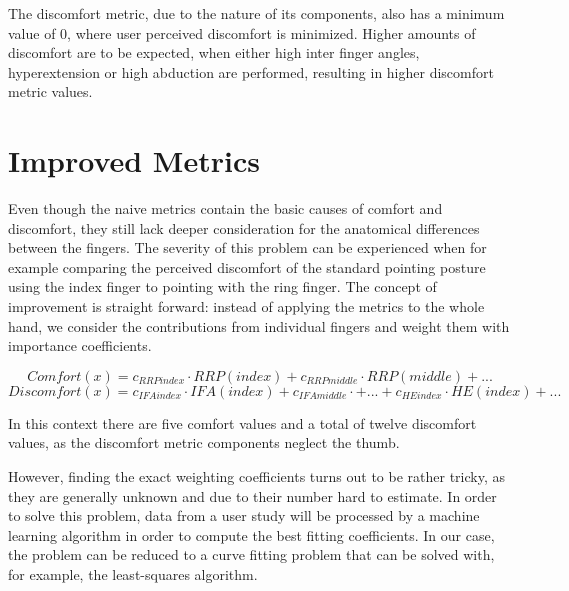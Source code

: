 The discomfort metric, due to the nature of its components, also has a minimum value of 0, where user perceived discomfort is minimized. Higher amounts of discomfort are to be expected, when either high inter finger angles, hyperextension or high abduction are performed, resulting in higher discomfort metric values. 

\section{Improved Metrics}

Even though the naive metrics contain the basic causes of comfort and discomfort, they still lack deeper consideration for the anatomical differences between the fingers. The severity of this problem can be experienced when for example comparing the perceived discomfort of the standard pointing posture using the index finger to pointing with the ring finger.
The concept of improvement is straight forward: instead of applying the metrics to the whole hand, we consider the contributions from individual fingers and weight them with importance coefficients. 


	\[
	Comfort(x) = c_{RRPindex}\cdot RRP(index) + c_{RRPmiddle}\cdot RRP(middle) + ...
	\]
	\[
	Discomfort(x) = c_{IFAindex}\cdot IFA(index)  +  c_{IFAmiddle}\cdot + ... + c_{HEindex}\cdot HE(index) + ...
	\]
	\vspace{5pt}


In this context there are five comfort values and a total of twelve discomfort values, as the discomfort metric components neglect the thumb. 

However, finding the exact weighting coefficients turns out to be rather tricky, as they are generally unknown and due to their number hard to estimate. In order to solve this problem, data from a user study will be processed by a machine learning algorithm in order to compute the best fitting coefficients. In our case, the problem can be reduced to a curve fitting problem that can be solved with, for example, the least-squares algorithm.